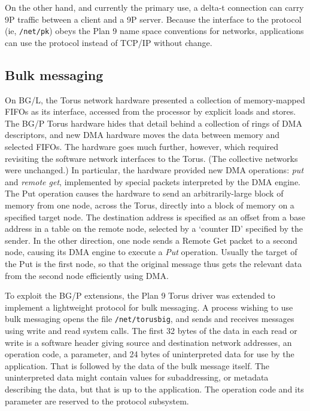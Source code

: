On the other hand, and currently the primary use, a delta-t connection
can carry 9P traffic between a client and a 9P server. Because the
interface to the protocol (ie, \texttt{/net/pk}) obeys the Plan 9 name
space conventions for networks, applications can use the protocol
instead of TCP/IP without change.

\subsection{Bulk messaging}

On BG/L, the Torus network hardware presented a collection of
memory-mapped FIFOs as its interface, accessed from the processor by
explicit loads and stores.  The BG/P Torus hardware hides that detail
behind a collection of rings of DMA descriptors, and new DMA hardware
moves the data between memory and selected FIFOs.  The hardware goes
much further, however, which required revisiting the software network
interfaces to the Torus.  (The collective networks were unchanged.)
In particular, the hardware provided new DMA operations: \emph{put}
and \emph{remote get}, implemented by special packets interpreted by
the DMA engine.  The Put operation causes the hardware to send an
arbitrarily-large block of memory from one node, across the Torus,
directly into a block of memory on a specified target node.  The
destination address is specified as an offset from a base address in a
table on the remote node, selected by a `counter ID' specified by the
sender.  In the other direction, one node sends a Remote Get packet to
a second node, causing its DMA engine to execute a \emph{Put}
operation.  Usually the target of the Put is the first node, so that
the original message thus gets the relevant data from the second node
efficiently using DMA.

To exploit the BG/P extensions, the Plan 9 Torus driver was extended
to implement a lightweight protocol for bulk messaging. A process
wishing to use bulk messaging opens the file \texttt{/net/torusbig},
and sends and receives messages using write and read system calls. The
first 32 bytes of the data in each read or write is a software header
giving source and destination network addresses, an operation code, a
parameter, and 24 bytes of uninterpreted data for use by the
application.  That is followed by the data of the bulk message itself.
The uninterpreted data might contain values for subaddressing, or
metadata describing the data, but that is up to the application. The
operation code and its parameter are reserved to the protocol
subsystem.

